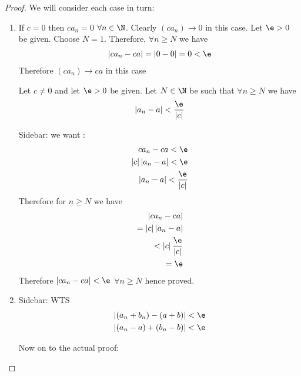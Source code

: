 \begin{proof}
	We will consider each case in turn:	
	\begin{enumerate}
		\item If $c = 0$ then $c a_n = 0$ $\forall n \in \N$. Clearly $\left( c a_n \right) \to 0$ in this case. Let $\e > 0$ be given. Choose $N = 1$. Therefore, $\forall n \ge N$ we have
		\begin{align}
			\left|c a_n - c a\right| = \left|0 - 0\right| = 0 < \e
		\end{align}
		Therefore $\left( c a_n \right) \to ca$ in this case

		Let $c \neq 0$ and let $\e > 0$ be given. Let $N \in \N$ be such that $\forall n \ge N$ we have 
			\begin{align}
				\left|a_n - a \right|< \frac{\e}{\left|c\right|} 
			\end{align}

			Sidebar: we want :
			\begin{align}
				c a_n - ca < \e \\
				\left|c\right|\left|a_n - a\right| < \e \\ 
				\left|a_n - a\right| < \frac{\e}{\left|c\right|}	
			\end{align}
			Therefore for $n \ge N$ we have
			\begin{align}
				\left|c a_n - ca\right| \\
				= \left|c\right|\left|a_n - a\right|\\
				< \left|c\right|\frac{\e}{\left|c\right|} \\
				= \e
			\end{align}
			Therefore $\left|c a_n - ca\right| < \e$ $\forall n \ge N$ hence proved.

		\item 
			Sidebar: WTS
			\begin{align}
				\left|\left( a_n + b_n \right) - \left( a + b \right)\right| < \e \\
				\left|\left( a_n - a \right) + \left( b_n - b \right) \right| < \e
			\end{align}

			Now on to the actual proof:


\end{enumerate}
\end{proof}
